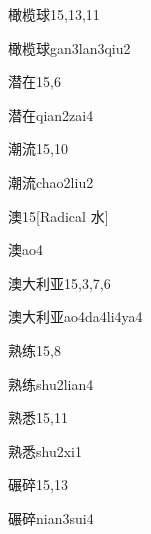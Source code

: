 \begin{entry}{橄榄球}{15,13,11}
  \begin{phonetics}{橄榄球}{gan3lan3qiu2}
  \end{phonetics}
\end{entry}

\begin{entry}{潜在}{15,6}
  \begin{phonetics}{潜在}{qian2zai4}
  \end{phonetics}
\end{entry}

\begin{entry}{潮流}{15,10}
  \begin{phonetics}{潮流}{chao2liu2}
  \end{phonetics}
\end{entry}

\begin{entry}{澳}{15}[Radical 水]
  \begin{phonetics}{澳}{ao4}
  \end{phonetics}
\end{entry}

\begin{entry}{澳大利亚}{15,3,7,6}
  \begin{phonetics}{澳大利亚}{ao4da4li4ya4}
  \end{phonetics}
\end{entry}

\begin{entry}{熟练}{15,8}
  \begin{phonetics}{熟练}{shu2lian4}
  \end{phonetics}
\end{entry}

\begin{entry}{熟悉}{15,11}
  \begin{phonetics}{熟悉}{shu2xi1}
  \end{phonetics}
\end{entry}

\begin{entry}{碾碎}{15,13}
  \begin{phonetics}{碾碎}{nian3sui4}
  \end{phonetics}
\end{entry}

